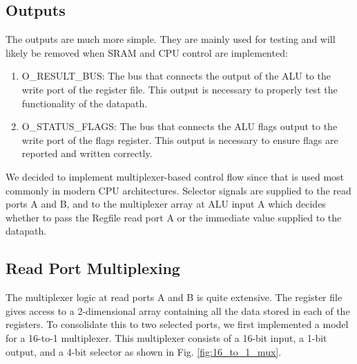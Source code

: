 \documentclass[conference]{IEEEtran}
\begin{document}
\subsection{Outputs}
The outputs are much more simple. They are mainly used for testing and will likely be removed when SRAM and CPU control are implemented:
\begin{enumerate}
    \item O\_RESULT\_BUS: The bus that connects the output of the ALU to the write port of the register file. This output is necessary to properly test the functionality of the datapath.
    \item O\_STATUS\_FLAGS: The bus that connects the ALU flags output to the write port of the flags register. This output is necessary to ensure flags are reported and written correctly.
\end{enumerate}

We decided to implement multiplexer-based control flow since that is used most commonly in modern CPU architectures. Selector signals are supplied to the read ports A and B, and to the multiplexer array at ALU input A which decides whether to pass the Regfile read port A or the immediate value supplied to the datapath.

\subsection{Read Port Multiplexing}
The multiplexer logic at read ports A and B is quite extensive. The register file gives access to a 2-dimensional array containing all the data stored in each of the registers. To consolidate this to two selected ports, we first implemented a model for a 16-to-1 multiplexer. This multiplexer consists of a 16-bit input, a 1-bit output, and a 4-bit selector as shown in Fig. \ref{fig:16_to_1_mux}.
\end{document}
